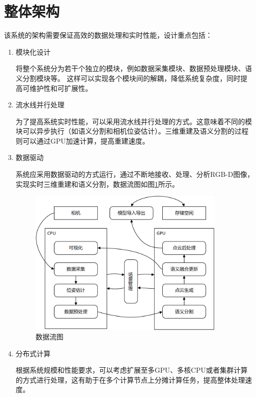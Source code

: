 \section{整体架构}
该系统的架构需要保证高效的数据处理和实时性能，设计重点包括：

\begin{enumerate}
	\item{模块化设计}
	\par 将整个系统分为若干个独立的模块，例如数据采集模块、数据预处理模块、语义分割模块等。
	这样可以实现各个模块间的解耦，降低系统复杂度，同时提高可维护性和可扩展性。

	\item{流水线并行处理}
	\par 为了提高系统实时性能，可以采用流水线并行处理的方式。这意味着不同的模块可以异步执行（如语义分割和相机位姿估计）。三维重建及语义分割的过程则可以通过GPU加速计算，提高重建速度。

	\item{数据驱动}
	\par 系统应采用数据驱动的方式运行，通过不断地接收、处理、分析RGB-D图像，实现实时三维重建和语义分割，数据流图如图\ref{fig:data_flow}所示。

	\begin{figure}[htb]
		\centering
		\includegraphics[width=0.9\textwidth]{figures/uml/data_flow.png}
		\caption{数据流图}
		\label{fig:data_flow}
	\end{figure}

	\item{分布式计算}
	\par 根据系统规模和性能要求，可以考虑扩展至多GPU、多核CPU或者集群计算的方式进行处理，这有助于在多个计算节点上分摊计算任务，提高整体处理速度。


\end{enumerate}
